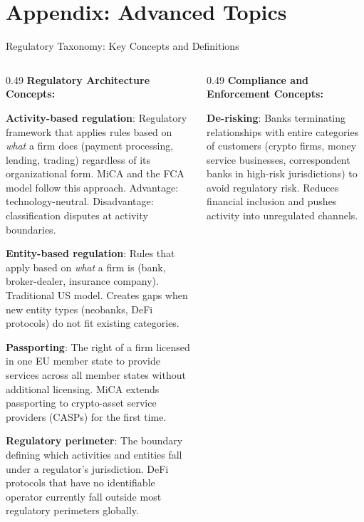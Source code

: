 \appendix

\section*{Appendix: Advanced Topics}


\begin{frame}{Regulatory Taxonomy: Key Concepts and Definitions}
  \begin{columns}[T]
    \begin{column}{0.49\textwidth}
      \textbf{Regulatory Architecture Concepts:}
      \vspace{0.2em}

      \textbf{Activity-based regulation}: Regulatory framework that applies rules based on \emph{what} a firm does (payment processing, lending, trading) regardless of its organizational form. MiCA and the FCA model follow this approach. Advantage: technology-neutral. Disadvantage: classification disputes at activity boundaries.

      \vspace{0.3em}
      \textbf{Entity-based regulation}: Rules that apply based on \emph{what} a firm is (bank, broker-dealer, insurance company). Traditional US model. Creates gaps when new entity types (neobanks, DeFi protocols) do not fit existing categories.

      \vspace{0.3em}
      \textbf{Passporting}: The right of a firm licensed in one EU member state to provide services across all member states without additional licensing. MiCA extends passporting to crypto-asset service providers (CASPs) for the first time.

      \vspace{0.3em}
      \textbf{Regulatory perimeter}: The boundary defining which activities and entities fall under a regulator's jurisdiction. DeFi protocols that have no identifiable operator currently fall outside most regulatory perimeters globally.
    \end{column}
    \begin{column}{0.49\textwidth}
      \textbf{Compliance and Enforcement Concepts:}
      \vspace{0.2em}

      \textbf{De-risking}: Banks terminating relationships with entire categories of customers (crypto firms, money service businesses, correspondent banks in high-risk jurisdictions) to avoid regulatory risk. Reduces financial inclusion and pushes activity into unregulated channels.


\end{column}
\end{columns}
\end{frame}
